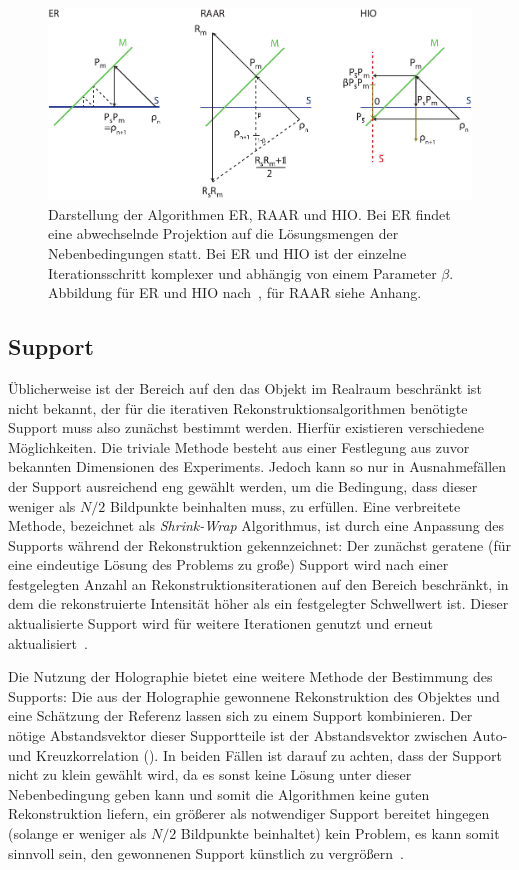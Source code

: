 \begin{figure}
	\centering
	\includegraphics[width=1\textwidth]{images/algorithmen.pdf}
	\caption[Rekonstruktionsalgorithmen]{Darstellung der Algorithmen ER, RAAR und HIO. Bei ER findet eine abwechselnde Projektion auf die Lösungsmengen der Nebenbedingungen statt. Bei ER und HIO ist der einzelne Iterationsschritt komplexer und abhängig von einem Parameter $\beta$. Abbildung für ER und HIO nach~\cite{marchesini2007}, für RAAR siehe Anhang.}
	\label{fig:recon}
\end{figure} 
\subsection{Support}
Üblicherweise ist der Bereich auf den das Objekt im Realraum beschränkt ist nicht bekannt, der für die iterativen Rekonstruktionsalgorithmen benötigte Support muss also zunächst bestimmt werden. Hierfür existieren verschiedene Möglichkeiten. Die triviale Methode besteht aus einer Festlegung aus zuvor bekannten Dimensionen des Experiments. Jedoch kann so nur in Ausnahmefällen der Support ausreichend eng gewählt werden, um die Bedingung, dass dieser weniger als $N/2$ Bildpunkte beinhalten muss, zu erfüllen.
Eine verbreitete Methode, bezeichnet als \textit{Shrink-Wrap} Algorithmus, ist durch eine Anpassung des Supports während der Rekonstruktion gekennzeichnet: Der zunächst geratene (für eine eindeutige Lösung des Problems  zu große) Support wird nach einer festgelegten Anzahl an Rekonstruktionsiterationen auf den Bereich beschränkt, in dem die rekonstruierte Intensität höher als ein festgelegter Schwellwert ist. Dieser aktualisierte Support wird für weitere Iterationen genutzt und erneut aktualisiert~\cite{marchesini2003}.

Die Nutzung der Holographie bietet eine weitere Methode der Bestimmung des Supports: Die aus der Holographie gewonnene Rekonstruktion des Objektes und eine Schätzung der Referenz lassen sich zu einem Support kombinieren. Der nötige Abstandsvektor dieser Supportteile ist der Abstandsvektor zwischen Auto- und Kreuzkorrelation ().
In beiden Fällen ist darauf zu achten, dass der Support nicht zu klein gewählt wird, da es sonst keine Lösung unter dieser Nebenbedingung geben kann und somit die Algorithmen keine guten Rekonstruktion liefern, ein größerer als notwendiger Support bereitet hingegen (solange er weniger als $N/2$ Bildpunkte beinhaltet) kein Problem, es kann somit sinnvoll sein, den gewonnenen Support künstlich zu vergrößern~\cite{huang2010}.

